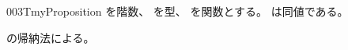\documentclass[index]{subfiles}
\begin{document}
\begin{myBlock}{003T}{myProposition}
  を階数、
  を型、
  を関数とする。
  は同値である。
\end{myBlock}
\begin{myProof}
  \myInlineMath{\myEmptyType}の帰納法による。
\end{myProof}
\end{document}
